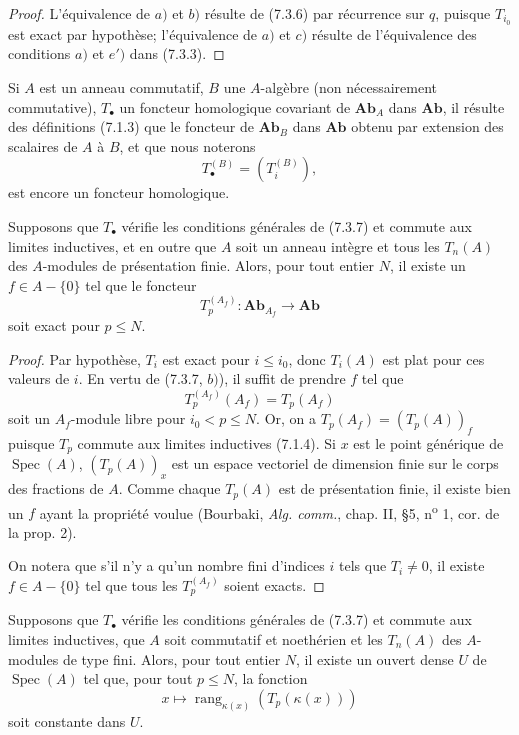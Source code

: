 \begin{proof}
L'équivalence de $a)$ et $b)$ résulte de (7.3.6) par récurrence sur $q$,
puisque $T_{i_0}$ est exact par hypothèse; l'équivalence de $a)$ et $c)$
résulte de l'équivalence des conditions $a)$ et $e')$ dans (7.3.3).
\end{proof}


\begin{env}[7.3.8]
Si $A$ est un anneau commutatif, $B$ une $A$-algèbre (non nécessairement
commutative), $T_\bullet$ un foncteur homologique covariant de
$\mathbf{Ab}_A$ dans $\mathbf{Ab}$, il résulte des définitions (7.1.3) que le
foncteur de $\mathbf{Ab}_B$ dans $\mathbf{Ab}$ obtenu par extension des
scalaires de $A$ à $B$, et que nous noterons
\[
  T_\bullet^{(B)}=(T_i^{(B)}),
\]
est encore un foncteur homologique.
\end{env}

\begin{corollary}[7.3.9]
Supposons que $T_\bullet$ vérifie les conditions générales de (7.3.7) et
commute aux limites inductives, et en outre que $A$ soit un anneau intègre et
tous les $T_n(A)$ des $A$-modules de présentation finie. Alors, pour tout
entier $N$, il existe un $f\in A-\{0\}$ tel que le foncteur
\[
  T_p^{(A_f)}:\mathbf{Ab}_{A_f}\longrightarrow\mathbf{Ab}
\]
soit exact pour $p\leq N$.
\end{corollary}

\begin{proof}
Par hypothèse, $T_i$ est exact pour $i\leq i_0$, donc $T_i(A)$ est plat pour
ces valeurs de $i$. En vertu de (7.3.7, $b)$), il suffit de prendre $f$ tel que
\[
  T_p^{(A_f)}(A_f)=T_p(A_f)
\]
soit un $A_f$-module libre pour $i_0<p\leq N$. Or, on a
$T_p(A_f)=(T_p(A))_f$ puisque $T_p$ commute aux limites inductives (7.1.4). Si
$x$ est le point générique de $\operatorname{Spec}(A)$, $(T_p(A))_x$ est un
espace vectoriel de dimension finie sur le corps des fractions de $A$. Comme
chaque $T_p(A)$ est de présentation finie, il existe bien un $f$ ayant la
propriété voulue (Bourbaki, \emph{Alg. comm.}, chap. II, \S 5,
n\textsuperscript{o} 1, cor. de la prop. 2).

On notera que s'il n'y a qu'un nombre fini d'indices $i$ tels que $T_i\ne0$,
il existe $f\in A-\{0\}$ tel que tous les $T_p^{(A_f)}$ soient exacts.
\end{proof}

\begin{corollary}[7.3.10]
Supposons que $T_\bullet$ vérifie les conditions générales de (7.3.7) et
commute aux limites inductives, que $A$ soit commutatif et noethérien et les
$T_n(A)$ des $A$-modules de type fini. Alors, pour tout entier $N$, il existe
un ouvert dense $U$ de $\operatorname{Spec}(A)$ tel que, pour tout $p\leq N$,
la fonction
\[
  x\mapsto\operatorname{rang}_{\kappa(x)}(T_p(\kappa(x)))
\]
soit constante dans $U$.
\end{corollary}

